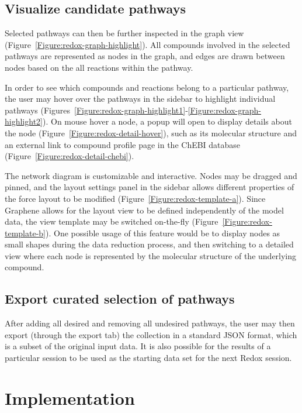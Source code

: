 \subsection{Visualize candidate pathways}

Selected pathways can then be further inspected in the graph view (Figure~\ref{Figure:redox-graph-highlight}).
All compounds involved in the selected pathways are represented as nodes in the graph, and edges are drawn between nodes based on the all reactions within the pathway.

In order to see which compounds and reactions belong to a particular pathway, the user may hover over the pathways in the sidebar to highlight individual pathways (Figures~\ref{Figure:redox-graph-highlight1}-\ref{Figure:redox-graph-highlight2}).
On mouse hover a node, a popup will open to display details about the node (Figure~\ref{Figure:redox-detail-hover}), such as its molecular structure and an external link to compound profile page in the ChEBI database (Figure~\ref{Figure:redox-detail-chebi}).

The network diagram is customizable and interactive.
Nodes may be dragged and pinned, and the layout settings panel in the sidebar allows different properties of the force layout to be modified (Figure~\ref{Figure:redox-template-a}).
Since Graphene allows for the layout view to be defined independently of the model data, the view template may be switched on-the-fly (Figure~\ref{Figure:redox-template-b}).
One possible usage of this feature would be to display nodes as small shapes during the data reduction process, and then switching to a detailed view where each node is represented by the molecular structure of the underlying compound.

\subsection{Export curated selection of pathways}

After adding all desired and removing all undesired pathways, the user may then export (through the export tab) the collection in a standard JSON format, which is a subset of the original input data.
It is also possible for the results of a particular session to be used as the starting data set for the next Redox session.

\section{Implementation}

